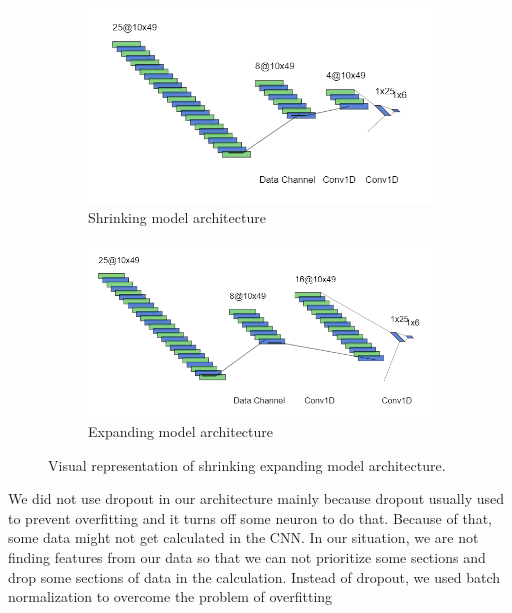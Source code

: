 \begin{figure}[h!]
  \centering
  \begin{subfigure}[b]{\linewidth}
    \includegraphics[width=\linewidth]{figures/shrinkingModel.png}
    \caption{Shrinking model architecture  }
  \end{subfigure}
\quad
\begin{subfigure}[b]{\linewidth}
    \includegraphics[width=\linewidth]{figures/expandModel.png}
    \caption{Expanding  model architecture}
  \end{subfigure}
 \caption{Visual representation of shrinking expanding model architecture.}
  \label{fig:vsExSr}
\end{figure}

We did not use dropout in our architecture mainly because dropout usually used to prevent overfitting and it turns off some neuron to do that. Because of that, some data might not get calculated in the CNN. In our situation, we are not finding features from our data so that we can not prioritize some sections and drop some sections of data in the calculation. Instead of dropout, we used batch normalization to overcome the problem of overfitting


